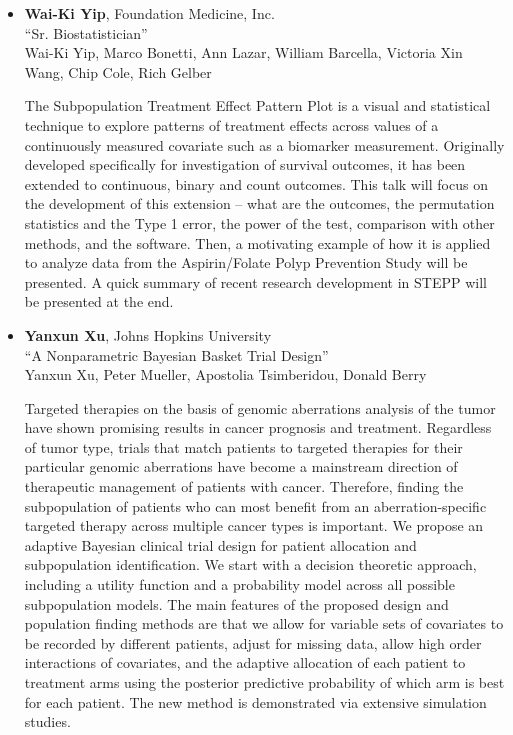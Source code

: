 \begin{itemize}
\item \textbf{Wai-Ki Yip}, Foundation Medicine, Inc. \\
``Sr. Biostatistician'' \\
Wai-Ki Yip, Marco Bonetti, Ann Lazar, William Barcella, Victoria Xin Wang, Chip Cole, Rich Gelber


The Subpopulation Treatment Effect Pattern Plot is a visual and statistical technique to explore patterns of treatment effects across values of a continuously measured covariate such as a biomarker measurement. Originally developed specifically for investigation of survival outcomes, it has been extended to continuous, binary and count outcomes.  This talk will focus on the development of this extension – what are the outcomes, the permutation statistics and the Type 1 error, the power of the test, comparison with other methods, and the software.  Then, a motivating example of how it is applied to analyze data from the Aspirin/Folate Polyp Prevention Study will be presented. 
A quick summary of recent research development in STEPP will be presented at the end.

\item \textbf{Yanxun Xu}, Johns Hopkins University \\
``A Nonparametric Bayesian Basket Trial Design'' \\
Yanxun Xu, Peter Mueller, Apostolia Tsimberidou, Donald Berry


Targeted therapies on the basis of genomic aberrations analysis of the tumor have shown promising results in cancer prognosis and treatment. Regardless of tumor type, trials that match patients to targeted therapies for their particular genomic aberrations have become a mainstream direction of therapeutic management of patients with cancer. Therefore, finding the subpopulation of patients who can most benefit from an aberration-specific targeted therapy across multiple cancer types is important. We propose an adaptive Bayesian clinical trial design for patient allocation and subpopulation identification. We start with a decision theoretic approach, including a utility function and a probability model across all
possible subpopulation models. The main features of the proposed design and population finding methods are that we allow for variable sets of covariates to be recorded by different patients, adjust for missing data, allow high order interactions of covariates, and the adaptive allocation of each patient to treatment arms using the posterior predictive probability of which arm is best for each patient. The new method is demonstrated via extensive simulation studies.


\end{itemize}
